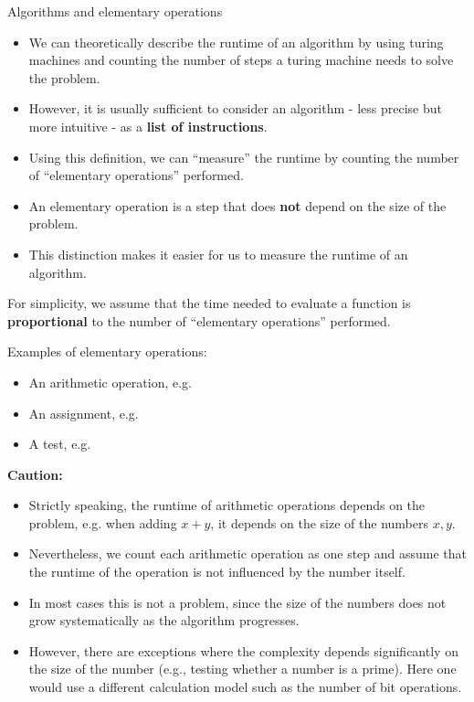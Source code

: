 \begin{vbframe}{Algorithms and elementary operations}

\begin{itemize}
\item We can theoretically describe the runtime of an algorithm by using turing machines and counting the number of steps a turing machine needs to solve the problem.
\item However, it is usually sufficient to consider an algorithm - less precise but more intuitive - as a \textbf{list of instructions}.
\item Using this definition, we can \enquote{measure} the runtime by counting the number of \enquote{elementary operations} performed.
\item An elementary operation is a step that does \textbf{not} depend on the size of the problem.
\item This distinction makes it easier for us to measure the runtime of an algorithm.
\end{itemize}

\framebreak

For simplicity, we assume that the time needed to evaluate a function is \textbf{proportional} to the number of \enquote{elementary operations} performed.

\lz

Examples of elementary operations:

\begin{itemize}
  \item An arithmetic operation, e.g. 
  \item An assignment, e.g. 
  \item A test, e.g. 
\end{itemize}

\framebreak

\textbf{Caution:}
\begin{itemize}
\item Strictly speaking, the runtime of arithmetic operations depends on the problem, e.g. when adding $x + y$, it depends on the size of the numbers $x, y$.
\item Nevertheless, we count each arithmetic operation as one step and assume that the runtime of the operation is not influenced by the number itself.
\item In most cases this is not a problem, since the size of the numbers does not grow systematically as the algorithm progresses.
\item However, there are exceptions where the complexity depends significantly on the size of the number (e.g., testing whether a number is a prime). Here one would use a different calculation model such as the number of bit operations.
\end{itemize}

\end{vbframe}

